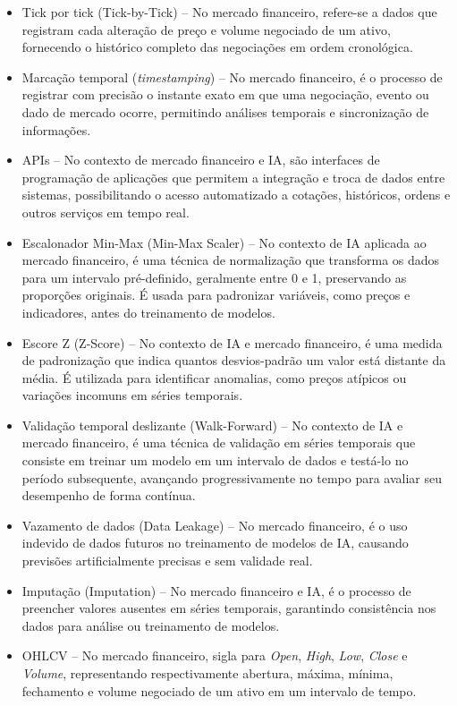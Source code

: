 \begin{itemize}
\item{Tick por tick (Tick-by-Tick)} – No mercado financeiro, refere-se a dados que registram cada alteração de preço e volume negociado de um ativo, fornecendo o histórico completo das negociações em ordem cronológica.
\item{Marcação temporal (\textit{timestamping})} – No mercado financeiro, é o processo de registrar com precisão o instante exato em que uma negociação, evento ou dado de mercado ocorre, permitindo análises temporais e sincronização de informações.
\item{APIs} – No contexto de mercado financeiro e IA, são interfaces de programação de aplicações que permitem a integração e troca de dados entre sistemas, possibilitando o acesso automatizado a cotações, históricos, ordens e outros serviços em tempo real.
\item{Escalonador Min-Max (Min-Max Scaler)} – No contexto de IA aplicada ao mercado financeiro, é uma técnica de normalização que transforma os dados para um intervalo pré-definido, geralmente entre 0 e 1, preservando as proporções originais. É usada para padronizar variáveis, como preços e indicadores, antes do treinamento de modelos.
\item{Escore Z (Z-Score)} – No contexto de IA e mercado financeiro, é uma medida de padronização que indica quantos desvios-padrão um valor está distante da média. É utilizada para identificar anomalias, como preços atípicos ou variações incomuns em séries temporais.
\item{Validação temporal deslizante (Walk-Forward)} – No contexto de IA e mercado financeiro, é uma técnica de validação em séries temporais que consiste em treinar um modelo em um intervalo de dados e testá-lo no período subsequente, avançando progressivamente no tempo para avaliar seu desempenho de forma contínua.
\item{Vazamento de dados (Data Leakage)} – No mercado financeiro, é o uso indevido de dados futuros no treinamento de modelos de IA, causando previsões artificialmente precisas e sem validade real.
\item{Imputação (Imputation)} – No mercado financeiro e IA, é o processo de preencher valores ausentes em séries temporais, garantindo consistência nos dados para análise ou treinamento de modelos.
\item{OHLCV} – No mercado financeiro, sigla para \textit{Open}, \textit{High}, \textit{Low}, \textit{Close} e \textit{Volume}, representando respectivamente abertura, máxima, mínima, fechamento e volume negociado de um ativo em um intervalo de tempo.

\end{itemize}
